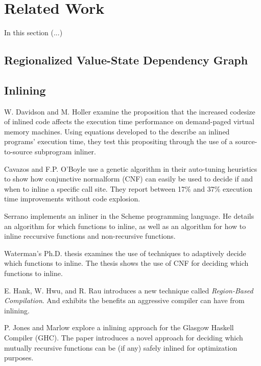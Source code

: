 
\section{Related Work}

In this section (...)

\subsection{Regionalized Value-State Dependency Graph}

\subsection{Inlining}

W. Davidson and M. Holler \cite{SubprogInlining} examine the proposition that
the increased codesize of inlined code affects the execution time performance on
demand-paged virtual memory machines. Using equations developed to the describe
an inlined programs' execution time, they test this propositing through the use
of a source-to-source subprogram inliner.

Cavazos and F.P. O'Boyle \cite{AutoTuningJavaHeuristics} use a genetic algorithm
in their auto-tuning heuristics to show how conjunctive normalform (CNF) can
easily be used to decide if and when to inline a specific call site. They report
between 17\% and 37\% execution time improvements without code explosion.

Serrano \cite{InlineWhenHowSerrano} implements an inliner in the Scheme
programming language. He details an algorithm for which functions to inline, as
well as an algorithm for how to inline reccursive functions and non-recursive
functions.

Waterman's Ph.D. thesis \cite{AdaptvCompilAndInlingWaterman} examines the use of
techniques to adaptively decide which functions to inline. The thesis shows the
use of CNF for deciding which functions to inline.

E. Hank, W. Hwu, and R. Rau \cite{RegionBasedCompilationIntroduction} introduces
a new technique called \textit{Region-Based Compilation}. And exhibits the
benefits an aggressive compiler can have from inlining.

P. Jones and Marlow \cite{GHC-paper} explore a inlining approach for the Glasgow
Haskell Compiler (GHC). The paper introduces a novel approach for deciding which
mutually recursive functions can be (if any) safely inlined for optimization
purposes.
